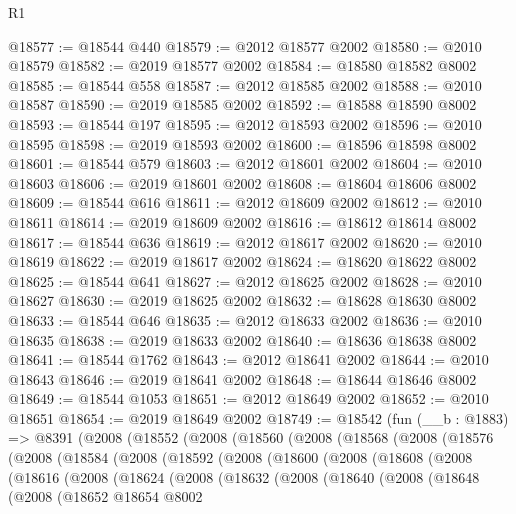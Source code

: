 \begin{lexlean}{R1}
\begin{coremodule}
@18577 := @18544 @440
@18579 := @2012 @18577 @2002
@18580 := @2010 @18579
@18582 := @2019 @18577 @2002
@18584 := @18580 @18582 @8002
@18585 := @18544 @558
@18587 := @2012 @18585 @2002
@18588 := @2010 @18587
@18590 := @2019 @18585 @2002
@18592 := @18588 @18590 @8002
@18593 := @18544 @197
@18595 := @2012 @18593 @2002
@18596 := @2010 @18595
@18598 := @2019 @18593 @2002
@18600 := @18596 @18598 @8002
@18601 := @18544 @579
@18603 := @2012 @18601 @2002
@18604 := @2010 @18603
@18606 := @2019 @18601 @2002
@18608 := @18604 @18606 @8002
@18609 := @18544 @616
@18611 := @2012 @18609 @2002
@18612 := @2010 @18611
@18614 := @2019 @18609 @2002
@18616 := @18612 @18614 @8002
@18617 := @18544 @636
@18619 := @2012 @18617 @2002
@18620 := @2010 @18619
@18622 := @2019 @18617 @2002
@18624 := @18620 @18622 @8002
@18625 := @18544 @641
@18627 := @2012 @18625 @2002
@18628 := @2010 @18627
@18630 := @2019 @18625 @2002
@18632 := @18628 @18630 @8002
@18633 := @18544 @646
@18635 := @2012 @18633 @2002
@18636 := @2010 @18635
@18638 := @2019 @18633 @2002
@18640 := @18636 @18638 @8002
@18641 := @18544 @1762
@18643 := @2012 @18641 @2002
@18644 := @2010 @18643
@18646 := @2019 @18641 @2002
@18648 := @18644 @18646 @8002
@18649 := @18544 @1053
@18651 := @2012 @18649 @2002
@18652 := @2010 @18651
@18654 := @2019 @18649 @2002
@18749 := @18542
    (fun (__b : @1883) =>
    @8391
      (@2008
        (@18552
          (@2008
            (@18560
              (@2008
                (@18568
                  (@2008
                    (@18576
                      (@2008
                        (@18584
                          (@2008
                            (@18592
                              (@2008
                                (@18600
                                  (@2008
                                    (@18608
                                      (@2008
                                        (@18616
                                          (@2008
                                            (@18624
                                              (@2008
                                                (@18632
                                                  (@2008
                                                    (@18640
                                                      (@2008
                                                        (@18648
                                                          (@2008
                                                            (@18652
                                                              @18654
                                                              @8002

\end{coremodule}
\end{lexlean}
